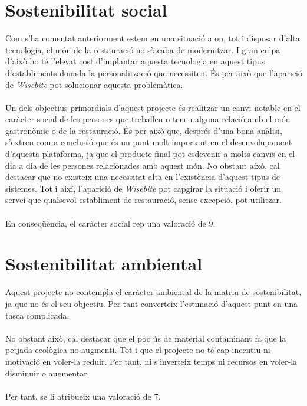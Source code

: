 
\section{Sostenibilitat social}

Com s'ha comentat anteriorment estem en una situació a on, tot i disposar d'alta tecnologia, el món de la restauració no s'acaba de modernitzar. I gran culpa d'això ho té l'elevat cost d'implantar aquesta tecnologia en aquest tipus d'establiments donada la personalització que necessiten. És per això que l'aparició de \textit{Wisebite} pot solucionar aquesta problemàtica.
\\\\
Un dels objectius primordials d'aquest projecte és realitzar un canvi notable en el caràcter social de les persones que treballen o tenen alguna relació amb el món gastronòmic o de la restauració. És per això que, després d'una bona anàlisi, s'extreu com a conclusió que és un punt molt important en el desenvolupament d'aquesta plataforma, ja que el producte final pot esdevenir a molts canvis en el dia a dia de les persones relacionades amb aquest món. No obstant això, cal destacar que no existeix una necessitat alta en l'existència d'aquest tipus de sistemes. Tot i així, l'aparició de \textit{Wisebite} pot capgirar la situació i oferir un servei que qualsevol establiment de restauració, sense excepció, pot utilitzar.
\\\\
En conseqüència, el caràcter social rep una valoració de 9.


\section{Sostenibilitat ambiental}

Aquest projecte no contempla el caràcter ambiental de la matriu de sostenibilitat, ja que no és el seu objectiu. Per tant converteix l'estimació d'aquest punt en una tasca complicada.
\\\\
No obstant això, cal destacar que el poc ús de material contaminant fa que la petjada ecològica no augmenti. Tot i que el projecte no té cap incentiu ni motivació en voler-la reduir. Per tant, ni s'inverteix temps ni recursos en voler-la disminuir o augmentar.
\\\\
Per tant, se li atribueix una valoració de 7.

